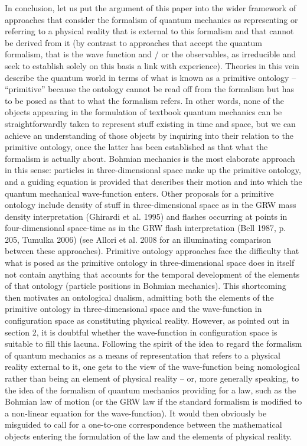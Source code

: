 \documentclass[12pt]{article}
\theoremstyle{definition}
\begin{document}
In conclusion, let us put the argument of this paper into the wider framework of approaches that consider the formalism of quantum mechanics as representing or referring to a physical reality that is external to this formalism and that cannot be derived from it (by contrast to approaches that accept the quantum formalism, that is the wave function and / or the observables, as irreducible and seek to establish solely on this basis a link with experience). Theories in this vein describe the quantum world in terms of what is known as a primitive ontology -- ``primitive'' because the ontology cannot be read off from the formalism but has to be posed as that to what the formalism refers. In other words, none of the objects appearing in the formulation of textbook quantum mechanics can be straightforwardly taken to represent stuff existing in time and space, but we can achieve an understanding of those objects by inquiring into their relation to the primitive ontology, once the latter has been established as that what the formalism is actually about. Bohmian mechanics is the most elaborate approach in this sense: particles in three-dimensional space make up the primitive ontology, and a guiding equation is provided that describes their motion and into which the quantum mechanical wave-function enters. Other proposals for a primitive ontology include density of stuff in three-dimensional space as in the GRW mass density interpretation (Ghirardi et al. 1995) and flashes occurring at points in four-dimensional space-time as in the GRW flash interpretation (Bell 1987, p. 205, Tumulka 2006) (see Allori et al. 2008 for an illuminating comparison between these approaches).
Primitive ontology approaches face the difficulty that what is posed as the primitive ontology in three-dimensional space does in itself not contain anything that accounts for the temporal development of the elements of that ontology (particle positions in Bohmian mechanics). This shortcoming then motivates an ontological dualism, admitting both the elements of the primitive ontology in three-dimensional space and the wave-function in configuration space as constituting physical reality. However, as pointed out in section 2, it is doubtful whether the wave-function in configuration space is suitable to fill this lacuna. Following the spirit of the idea to regard the formalism of quantum mechanics as a means of representation that refers to a physical reality external to it, one gets to the view of the wave-function being nomological rather than being an element of physical reality -- or, more generally speaking, to the idea of the formalism of quantum mechanics providing for a law, such as the Bohmian law of motion (or the GRW law if the standard formalism is modified to a non-linear equation for the wave-function). It would then obviously be misguided to call for a one-to-one correspondence between the mathematical objects entering the formulation of the law and the elements of physical reality.
\end{document}
